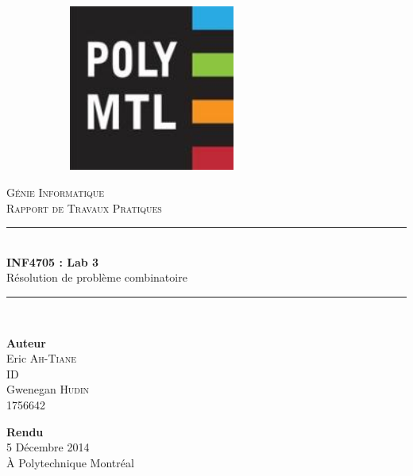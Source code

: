 \documentclass[10pt,a4paper]{article}
\newcommand{\HRule}{\rule{\linewidth}{0.5mm}}
\begin{document}
\begin{titlepage}
	\begin{center}
		\begin{figure}
        \begin{subfigure}[c]{0.2\textwidth}
        		\centering
                \includegraphics[width=0.6\textwidth]{images/logo-polymtl}
        \end{subfigure}
		\end{figure}
		
		
		\vspace{30pt}
		\textsc{\huge Génie Informatique}\\
		\textsc{\LARGE Rapport de Travaux Pratiques}\\		
		\vfill
		
		\HRule \\[0.7cm]
		{\Huge \bfseries INF4705 : Lab 3}\\[0.4cm]
		{\Large Résolution de problème combinatoire}\\[0.2cm]
		\HRule\\[1cm]
		
		\vfill
		
		\begin{minipage}{0.49\textwidth}
			\begin{flushleft} \LARGE
				\textbf{Auteur}\\
				Eric \textsc{Ah-Tiane}\\ ID\\
				Gwenegan \textsc{Hudin}\\ 1756642\\[0.5cm]
			\end{flushleft}
		\end{minipage}
		\begin{minipage}{0.49\textwidth}
			\begin{flushright} \LARGE
				\textbf{Rendu}\\
				5 Décembre 2014\\ À Polytechnique Montréal\\[0.5cm]
			\end{flushright}
		\end{minipage}
	\end{center}
\end{titlepage}
\end{document}
